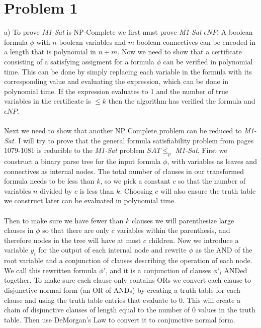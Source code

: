 \documentclass{article}
\begin{document}
\section*{Problem 1}
a) To prove \textit{M1-Sat} is NP-Complete we first must prove \textit{M1-Sat} $\epsilon NP$.  A boolean formula $\phi$ with $n$ boolean variables and $m$ boolean connectives can be encoded in a length that is polynomial in $n+m$. Now we need to show that a certificate consisting of a satisfying assigment for a formula $\phi$ can be verified in polynomial time.  This can be done by simply replacing each variable in the formula with its corresponding value and evaluating the expression, which can be done in polynomial time. If the expression evaluates to 1 and the number of true variables in the certificate is $\leq k$ then the algorithm has verified the formula and  $\epsilon NP$.\\\\
Next we need to show that another NP Complete problem can be reduced to \textit{M1-Sat}. I will try to prove that the general formula satisfiability problem from pages 1079-1081 is reducible to the \textit{M1-Sat} problem $SAT \leq_p$ \textit{M1-Sat}.  First we construct a binary parse tree for the input formula $\phi$, with variables as leaves and connectives as internal nodes. The total number of clauses in our transformed formula needs to be less than $k$, so we pick a constant $c$ so that the number of variables $n$ divided by $c$ is less than $k$. Choosing $c$ will also ensure the truth table we construct later can be evaluated in polynomial time.\\\\ 
Then to make sure we have fewer than $k$ clauses we will parenthesize large clauses in $\phi$ so that there are only $c$ variables within the parenthesis, and therefore nodes in the tree will have at most $c$ children. Now we introduce a variable $y_i$ for the output of each internal node and rewrite $\phi$ as the AND of the root variable and a conjunction of clauses describing the operation of each node. We call this rewritten formula $\phi'$, and it is a conjunction of clauses $\phi'_i$ ANDed together. To make sure each clause only contains ORs we convert each clause to disjunctive normal form (an OR of ANDs) by creating a truth table for each clause and using the truth table entries that evaluate to 0. This will create a chain of disjunctive clauses of length equal to the number of 0 values in the truth table. Then use DeMorgan's Law to convert it to conjunctive normal form.\\\\
\end{document}
